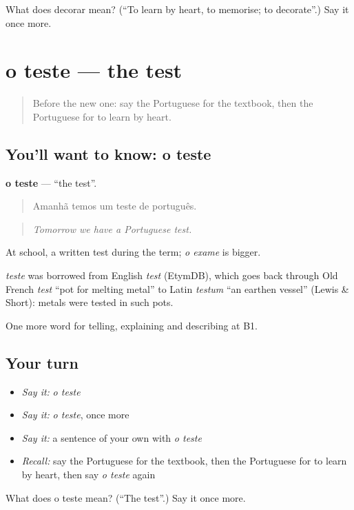 \begin{tcolorbox}[breakable,colback=teal!4,colframe=teal!35!black,title={Before you move on}]
What does decorar mean? (\textquotedblleft{}To learn by heart, to memorise; to decorate\textquotedblright{}.) Say it once more.
\end{tcolorbox}
\section[o teste]{o teste — the test}

\label{lesson:PT-C378-teste}



\begin{quote}
Before the new one: say the Portuguese for the textbook, then the Portuguese for to learn by heart.
\end{quote}

\subsection*{You'll want to know: o teste}
\textbf{o teste} — \textquotedblleft{}the test\textquotedblright{}.

\begin{quote}
Amanhã temos um teste de português.
\end{quote}

\begin{quote}
\emph{Tomorrow we have a Portuguese test.}
\end{quote}

At school, a written test during the term; \emph{o exame} is bigger.

\begin{cousinweb}
\emph{teste} was borrowed from English \emph{test} (EtymDB), which goes back through Old French \emph{test} \textquotedblleft{}pot for melting metal\textquotedblright{} to Latin \emph{testum} \textquotedblleft{}an earthen vessel\textquotedblright{} (Lewis \& Short): metals were tested in such pots.
\end{cousinweb}

\begin{grammarlens}[title={What you've built}]
One more word for telling, explaining and describing at B1.
\end{grammarlens}

\subsection*{Your turn}
\begin{itemize}
\raggedright
  \item \emph{Say it:} \emph{o teste}
  \item \emph{Say it:} \emph{o teste}, once more
  \item \emph{Say it:} a sentence of your own with \emph{o teste}
  \item \emph{Recall:} say the Portuguese for the textbook, then the Portuguese for to learn by heart, then say \emph{o teste} again
\end{itemize}

\begin{tcolorbox}[breakable,colback=teal!4,colframe=teal!35!black,title={Before you move on}]
What does o teste mean? (\textquotedblleft{}The test\textquotedblright{}.) Say it once more.
\end{tcolorbox}
